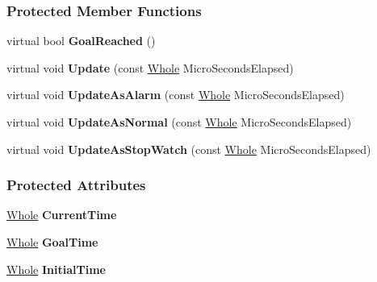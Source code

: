 \subsubsection*{Protected Member Functions}
\begin{DoxyCompactItemize}
\item 
\hypertarget{classphys_1_1SimpleTimer_a435c974da0511d6beafcefb9b987a21c}{
virtual bool {\bfseries GoalReached} ()}
\label{classphys_1_1SimpleTimer_a435c974da0511d6beafcefb9b987a21c}

\item 
\hypertarget{classphys_1_1SimpleTimer_a4fa114aae9cf0418edd8a80f307f3906}{
virtual void {\bfseries Update} (const \hyperlink{namespacephys_a460f6bc24c8dd347b05e0366ae34f34a}{Whole} MicroSecondsElapsed)}
\label{classphys_1_1SimpleTimer_a4fa114aae9cf0418edd8a80f307f3906}

\item 
\hypertarget{classphys_1_1SimpleTimer_a7fcd77c7b49f807cc9e43b3b521d2056}{
virtual void {\bfseries UpdateAsAlarm} (const \hyperlink{namespacephys_a460f6bc24c8dd347b05e0366ae34f34a}{Whole} MicroSecondsElapsed)}
\label{classphys_1_1SimpleTimer_a7fcd77c7b49f807cc9e43b3b521d2056}

\item 
\hypertarget{classphys_1_1SimpleTimer_ab7ff17f3515f07713b65df8887801f0d}{
virtual void {\bfseries UpdateAsNormal} (const \hyperlink{namespacephys_a460f6bc24c8dd347b05e0366ae34f34a}{Whole} MicroSecondsElapsed)}
\label{classphys_1_1SimpleTimer_ab7ff17f3515f07713b65df8887801f0d}

\item 
\hypertarget{classphys_1_1SimpleTimer_a5b9cdf890b478ab1f0bf8d0919df4157}{
virtual void {\bfseries UpdateAsStopWatch} (const \hyperlink{namespacephys_a460f6bc24c8dd347b05e0366ae34f34a}{Whole} MicroSecondsElapsed)}
\label{classphys_1_1SimpleTimer_a5b9cdf890b478ab1f0bf8d0919df4157}

\end{DoxyCompactItemize}
\subsubsection*{Protected Attributes}
\begin{DoxyCompactItemize}
\item 
\hypertarget{classphys_1_1SimpleTimer_ae8e00fd4b0a6ec8d8883910b1b2f5cf1}{
\hyperlink{namespacephys_a460f6bc24c8dd347b05e0366ae34f34a}{Whole} {\bfseries CurrentTime}}
\label{classphys_1_1SimpleTimer_ae8e00fd4b0a6ec8d8883910b1b2f5cf1}

\item 
\hypertarget{classphys_1_1SimpleTimer_a8d5eeace9037f65ecf1f40a96c7aae29}{
\hyperlink{namespacephys_a460f6bc24c8dd347b05e0366ae34f34a}{Whole} {\bfseries GoalTime}}
\label{classphys_1_1SimpleTimer_a8d5eeace9037f65ecf1f40a96c7aae29}

\item 
\hypertarget{classphys_1_1SimpleTimer_a707ffcc6a464785ad8438a9b8f70dd09}{
\hyperlink{namespacephys_a460f6bc24c8dd347b05e0366ae34f34a}{Whole} {\bfseries InitialTime}}
\label{classphys_1_1SimpleTimer_a707ffcc6a464785ad8438a9b8f70dd09}

\end{DoxyCompactItemize}



